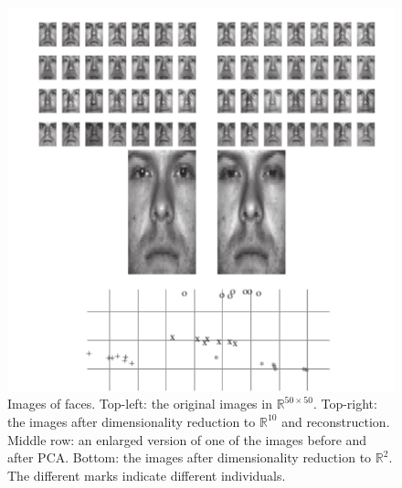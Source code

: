 \documentclass[12pt]{report}
\theoremstyle{plain}
\begin{document}
\begin{flushleft}
\begin{figure}[!h]
	\centering
	\includegraphics[scale=1.3]{images/PCA_faces.pdf}
	\caption{Images of faces. Top-left: the original images in $\mathds{R}^{50\times 50}$. Top-right: the images after dimensionality reduction to $\mathds{R}^10$ and reconstruction. Middle row: an enlarged version of one of the images before and after PCA. Bottom: the images after dimensionality reduction to $\mathds{R}^2$. The different marks indicate different individuals.}
	\label{fig:PCA_faces}
\end{figure}

\end{flushleft}
\end{document}
